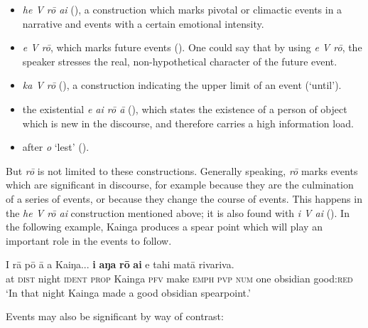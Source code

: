 \begin{itemize}
\item 
\textit{he V rō {\ꞌ}ai} (), a construction which marks pivotal or climactic events in a narrative and events with a certain emotional intensity. 

\item 
\textit{e V rō}, which marks future events (). One could say that by using \textit{e V rō}, the speaker stresses the real, non-hypothetical character of the future event.

\item 
\textit{ka V rō} (), a construction indicating the upper limit of an event (‘until’).

\item 
the existential \textit{e ai rō {\ꞌ}ā} (), which states the existence of a person of object which is new in the discourse, and therefore carries a high information load.

\item 
after \textit{{\ꞌ}o} ‘lest’ (). 

\end{itemize}

But \textit{rō} is not limited to these constructions. Generally speaking, \textit{rō} marks events which are significant in discourse, for example because they are the culmination of a series of events, or because they change the course of events. This happens in the \textit{he V rō {\ꞌ}ai} construction mentioned above; it is also found with \textit{i V ai} (). In the following example, Kainga produces a spear point which will play an important role in the events to follow.

\ea\label{ex:7.114}
\gll {\ꞌ}I rā pō {\ꞌ}ā a Kaiŋa... \textbf{i} \textbf{aŋa} \textbf{rō} \textbf{ai} e tahi matā rivariva. \\
at \textsc{dist} night \textsc{ident} \textsc{prop} Kainga \textsc{pfv} make \textsc{emph} \textsc{pvp} \textsc{num} one obsidian good:\textsc{red} \\

\glt
‘In that night Kainga made a good obsidian spearpoint.’ \textstyleExampleref{[R304.015]} 
\z

Events may also be significant by way of contrast:

